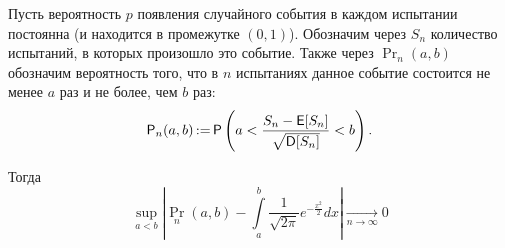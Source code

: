 \begin{itemize}
        \begin{theorem}
           Пусть вероятность $p$ появления случайного события в каждом испытании постоянна (и находится в
           промежутке $ (0, 1) $). Обозначим через $S_n$ количество испытаний, в которых произошло это
           событие. Также через $ \Pr_n(a, b) $ обозначим вероятность того, что в $ n $ испытаниях данное
           событие состоится не менее $ a $ раз и не более, чем $ b $ раз:
            \[
                \Pr_n(a,b)\mathop{:=} \Pr\left( a < \frac{S_n - \E[S_n]}{\sqrt{\D[S_n]}} < b \right).
            \]

            Тогда
            \[
                \sup_{a<b} \left|\Pr_n(a, b) - \int\limits_a^b\frac{1}{\sqrt{2\pi}}e^{-\frac{x^{2}}{2}}dx\right| \xrightarrow[n\to\infty]{} 0
            \]
        \end{theorem}

\end{itemize}
